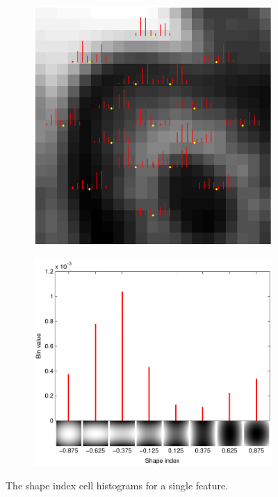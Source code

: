 \documentclass[thesis.tex]{subfiles}
\begin{document}
\begin{figure}[p]
   	\centering
	\begin{subfigure}[t]{0.65\textwidth}
	    \includegraphics[width=\textwidth]{img/cellHistFigureSi.pdf}
    \end{subfigure}
    \begin{subfigure}[t]{0.65\textwidth}
    	\centering
    	\includegraphics[width=\textwidth]{img/cellHistFigureSiExample.pdf}
   	\end{subfigure}
   	\caption{The shape index cell histograms for a single feature.}
    \label{fig:cellHistFigureSiC}
\end{figure}
\end{document}
